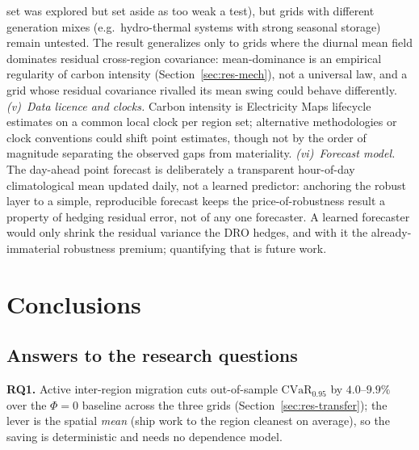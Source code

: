\documentclass[12pt]{article}
\newcommand{\CVaR}{\mathrm{CVaR}}
\begin{document}
set was explored but set aside as too weak a test), but grids with different generation
mixes (e.g.\ hydro-thermal systems with strong seasonal storage) remain untested. The result
generalizes only to grids where the diurnal mean field dominates residual
cross-region covariance: mean-dominance is an empirical regularity of carbon
intensity (Section~\ref{sec:res-mech}), not a universal law, and a grid whose
residual covariance rivalled its mean swing could behave differently. \emph{(v)~Data licence and clocks.} Carbon
intensity is Electricity Maps lifecycle estimates on a common local clock per
region set; alternative methodologies or clock conventions could shift
point estimates, though not by the order of magnitude separating the observed gaps
from materiality.
\emph{(vi)~Forecast model.} The day-ahead point forecast is deliberately a transparent
hour-of-day climatological mean updated daily, not a learned predictor: anchoring the
robust layer to a simple, reproducible forecast keeps the price-of-robustness result a
property of hedging residual error, not of any one forecaster. A learned forecaster
would only shrink the residual variance the DRO hedges, and with it the
already-immaterial robustness premium; quantifying that is future work.

\section{Conclusions}\label{sec:conclusion}

\subsection{Answers to the research questions}
\textbf{RQ1.} Active inter-region migration cuts out-of-sample $\CVaR_{0.95}$ by
$4.0$--$9.9\%$ over the $\Phi=0$ baseline across the three grids
(Section~\ref{sec:res-transfer}); the lever is the spatial \emph{mean} (ship work to the
region cleanest on average), so the saving is deterministic and needs no dependence model.
\end{document}
